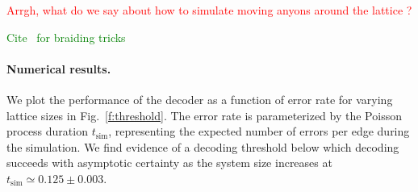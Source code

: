 \documentclass[aps, prl, letterpaper, twocolumn, superscriptaddress, notitlepage, 10pt]{revtex4-1}
\newcommand{\Fref}[1]{Fig.~\ref{#1}}
\newcommand{\cggb}[1]{\textcolor{blue}{#1}}
\newcommand{\dude}[1]{\textcolor{red}{#1}}
\newcommand{\stf}[1]{\textcolor{green}{#1}}
\begin{document}
\dude{Arrgh, what do we say about how to simulate moving anyons around
the lattice ?}

%

\stf{Cite~\cite{Pfeifer2010} for braiding tricks}

\paragraph{Numerical results.}

We plot the performance of the decoder as a function of error rate for varying lattice sizes in 
\Fref{f:threshold}. 
The error rate is parameterized by the Poisson process duration $t_{\mathrm{sim}}$, representing the expected number of errors per edge during the simulation. 
We find evidence of a decoding threshold below which decoding succeeds with asymptotic 
certainty as the system size increases at $t_{\mathrm{sim}}\simeq 0.125 \pm 0.003$.
\end{document}
